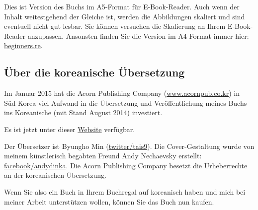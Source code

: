 



\ifdefined\ebook
Dies ist Version des Buchs im A5-Format für E-Book-Reader.
Auch wenn der Inhalt weitestgehend der Gleiche ist, werden die Abbildungen skaliert und sind eventuell
nicht gut lesbar.
Sie können versuchen die Skalierung an Ihrem E-Book-Reader anzupassen.
Ansonsten finden Sie die Version im A4-Format immer hier:
\href{http://go.yurichev.com/17009}{beginners.re}.
\fi

\subsection*{Über die koreanische Übersetzung}

Im Januar 2015 hat die Acorn Publishing Company (\href{http://www.acornpub.co.kr}{www.acornpub.co.kr}) in Süd-Korea
viel Aufwand in die Übersetzung und Veröffentlichung meines Buchs ins Koreanische (mit Stand August 2014) investiert.

Es ist jetzt unter dieser \href{http://go.yurichev.com/17343}{Website} verfügbar.

\iffalse
\begin{figure}[H]
\centering
\texttt{[image: acorn\_cover.jpg]}
\end{figure}
\fi

Der Übersetzer ist Byungho Min (\href{http://go.yurichev.com/17344}{twitter/tais9}).
Die Cover-Gestaltung wurde von meinem künstlerisch begabten Freund Andy Nechaevsky erstellt:
\href{http://go.yurichev.com/17023}{facebook/andydinka}.
Die Acorn Publishing Company besetzt die Urheberrechte an der koreanischen Übersetzung.

Wenn Sie also ein  Buch in Ihrem Buchregal auf koreanisch haben und 
mich bei meiner Arbeit unterstützen wollen, können Sie das Buch nun kaufen.
